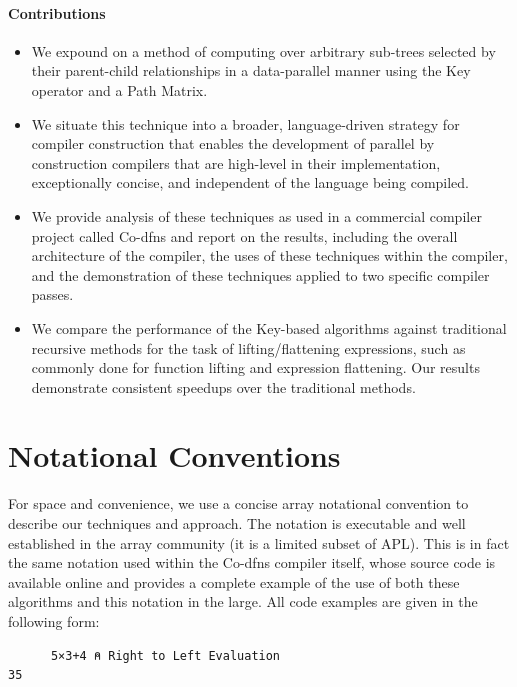 ﻿\documentclass[numbers,10pt,preprint]{sigplanconf}
\begin{document}
\paragraph{Contributions}

\begin{itemize}[noitemsep]

\item We expound on a method \cite{hsu2016key} of computing over arbitrary sub-trees selected by their parent-child relationships in a data-parallel manner using the Key operator and a Path Matrix.

\item We situate this technique into a broader, language-driven strategy for compiler construction that enables the development of parallel by construction compilers that are high-level in their implementation, exceptionally concise, and independent of the language being compiled.

\item We provide analysis of these techniques as used in a commercial compiler project called Co-dfns and report on the results, including the overall architecture of the compiler, the uses of these techniques within the compiler, and the demonstration of these techniques applied to two specific compiler passes.

\item We compare the performance of the Key-based algorithms against traditional recursive methods for the task of lifting/flattening expressions, such as commonly done for function lifting and expression flattening. Our results demonstrate consistent speedups over the traditional methods.

\end{itemize}

\section{Notational Conventions}

For space and convenience, we use a concise array notational convention to describe our techniques and approach. The notation is executable and well established in the array community (it is a limited subset of APL). This is in fact the same notation used within the Co-dfns compiler itself, whose source code is available online and provides a complete example of the use of both these algorithms and this notation in the large. All code examples are given in the following form:

\begin{verbatim}
      5×3+4 ⍝ Right to Left Evaluation
35
\end{verbatim}
\end{document}
